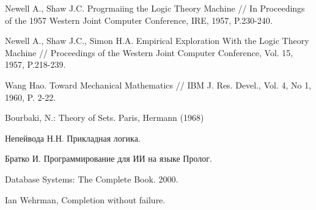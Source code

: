 \begin{thebibliography}{99}
 Newell A., Shaw J.C. Progrmaiing the Logic Theory Machine // In Proceedings of the 1957 Western Joint Computer Conference, IRE, 1957, P.230-240.

 Newell A., Shaw J.C., Simon H.A. Empirical Exploration With the Logic Theory Machine // Proceedings of the Western Joint Computer Conference, Vol. 15, 1957, P.218-239.

 Wang Hao. Toward Mechanical Mathematics // IBM J. Res. Devel., Vol. 4, No 1, 1960, P. 2-22. 

 Bourbaki, N.: Theory of Sets. Paris, Hermann (1968)

 Непейвода Н.Н. Прикладная логика.

 Братко И. Программирование для ИИ на языке Пролог.

 Database Systems: The Complete Book. 2000.

 Ian Wehrman, Completion without failure.

\end{thebibliography}



